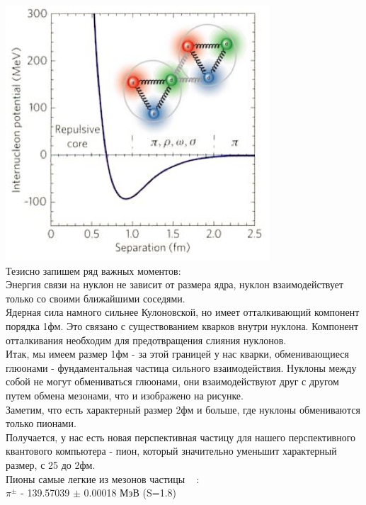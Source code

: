 \documentclass[11pt]{report}
\begin{document}
\includegraphics[scale=1]{ip} \\

Тезисно запишем ряд важных моментов:\\

Энергия связи на нуклон не зависит от размера ядра, нуклон взаимодействует только со своими ближайшими соседями.\\

Ядерная сила намного сильнее Кулоновской, но имеет отталкивающий компонент порядка 1фм. Это связано с существованием кварков внутри нуклона. Компонент отталкивания необходим для предотвращения слияния нуклонов. \\

Итак, мы имеем размер 1фм - за этой границей у нас кварки, обменивающиеся глюонами - фундаментальная частица сильного взаимодействия. Нуклоны между собой не могут обмениваться глюонами, они взаимодействуют друг с другом путем обмена мезонами, что и изображено на рисунке. \\

Заметим, что есть характерный размер 2фм и больше, где нуклоны обмениваются только пионами.\\

Получается, у нас есть новая перспективная частицу для нашего перспективного квантового компьютера - пион, который значительно уменьшит характерный размер, с 25 до 2фм. \\

Пионы самые легкие из мезонов частицы ~\cite{pion} :\\

 $\pi^{\pm } $ - 139.57039 $\pm$ 0.00018 МэВ (S=1.8)\\
 
\end{document}
